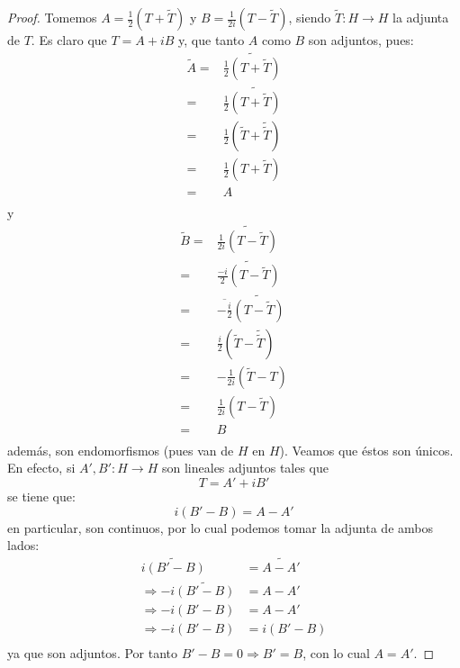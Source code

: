 \documentclass[12pt]{report}
\theoremstyle{largebreak}
\newcommand\cf[3]{\ensuremath{#1:#2\rightarrow#3}}
\newcommand\adj[1]{\ensuremath{\widetilde{#1}}}
\newcommand\conj[1]{\ensuremath{\overline{#1}}}
\begin{document}
    \begin{proof}
        Tomemos $A=\frac{1}{2}(T+\adj{T})$ y $B=\frac{1}{2i}(T-\adj{T})$, siendo $\cf{\adj{T}}{H}{H}$ la adjunta de $T$. Es claro que $T=A+iB$ y, que tanto $A$ como $B$ son adjuntos, pues:
        \begin{equation*}
            \begin{split}
                \adj{A}=&\adj{\frac{1}{2}(T+\adj{T})} \\
                =&\frac{1}{2}\adj{(T+\adj{T})} \\
                =&\frac{1}{2}(\adj{T}+\adj{\adj{T}}) \\
                =&\frac{1}{2}(T+\adj{T}) \\
                =&A\\
            \end{split}
        \end{equation*}
        y
        \begin{equation*}
            \begin{split}
                \adj{B}=&\adj{\frac{1}{2i}(T-\adj{T})} \\
                =&\adj{\frac{-i}{2}(T-\adj{T})} \\
                =&\conj{-\frac{i}{2}}\adj{(T-\adj{T})} \\
                =&\frac{i}{2}(\adj{T}-\adj{\adj{T}}) \\
                =&-\frac{1}{2i}(\adj{T}-T) \\
                =&\frac{1}{2i}(T-\adj{T}) \\
                =&B \\
            \end{split}
        \end{equation*}
        además, son endomorfismos (pues van de $H$ en $H$). Veamos que éstos son únicos. En efecto, si $\cf{A',B'}{H}{H}$ son lineales adjuntos tales que
        \begin{equation*}
            T=A'+iB'
        \end{equation*}
        se tiene que:
        \begin{equation*}
            i(B'-B)=A-A'
        \end{equation*}
        en particular, son continuos, por lo cual podemos tomar la adjunta de ambos lados:
        \begin{equation*}
            \begin{split}
                \adj{i(B'-B)}&=\adj{A-A'} \\
                \Rightarrow -i\adj{(B'-B)}&=A-A'\\
                \Rightarrow -i(B'-B)&=A-A'\\
                \Rightarrow -i(B'-B)&=i(B'-B)\\
            \end{split}
        \end{equation*}
        ya que son adjuntos. Por tanto $B'-B=0\Rightarrow B'=B$, con lo cual $A=A'$.
    \end{proof}
\end{document}

